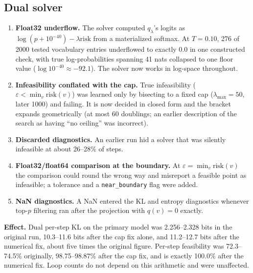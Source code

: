 \documentclass[11pt]{article}
\newcommand{\risk}{\mathrm{risk}}
\begin{document}
\subsection*{Dual solver}
\begin{enumerate}[leftmargin=*]
  \item \textbf{Float32 underflow.} The solver computed $q_\lambda$'s logits as $\log(p+10^{-40})-\lambda\risk$ from a materialized softmax. At $T{=}0.10$, 276 of 2000 tested vocabulary entries underflowed to exactly $0.0$ in one constructed check, with true log-probabilities spanning 41 nats collapsed to one floor value ($\log10^{-40}\approx-92.1$). The solver now works in log-space throughout.
  \item \textbf{Infeasibility conflated with the cap.} True infeasibility ($\varepsilon<\min_v\risk(v)$) was learned only by bisecting to a fixed cap ($\lambda_{\max}{=}50$, later 1000) and failing. It is now decided in closed form and the bracket expands geometrically (at most 60 doublings; an earlier description of the search as having ``no ceiling'' was incorrect).
  \item \textbf{Discarded diagnostics.} An earlier run hid a solver that was silently infeasible at about 26--28\% of steps.
  \item \textbf{Float32/float64 comparison at the boundary.} At $\varepsilon=\min_v\risk(v)$ the comparison could round the wrong way and misreport a feasible point as infeasible; a tolerance and a \texttt{near\_\allowbreak{}boundary} flag were added.
  \item \textbf{NaN diagnostics.} A NaN entered the KL and entropy diagnostics whenever top-$p$ filtering ran after the projection with $q(v){=}0$ exactly.
\end{enumerate}
\textbf{Effect.} Dual per-step KL on the primary model was 2.256--2.328 bits in the original run, 10.3--11.6 bits after the cap fix alone, and 11.2--12.7 bits after the numerical fix, about five times the original figure. Per-step feasibility was 72.3--74.5\% originally, 98.75--98.87\% after the cap fix, and is exactly 100.0\% after the numerical fix. Loop counts do not depend on this arithmetic and were unaffected.
\end{document}
